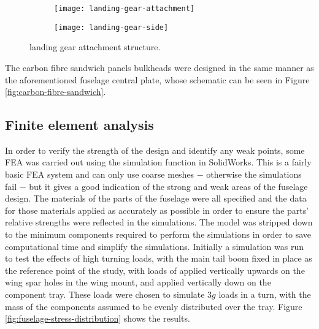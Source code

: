 \documentclass[../../main.tex]{subfiles}
\begin{document}

\begin{figure}[H]

    \centering
    \begin{subfigure}[b]{0.4\columnwidth}
        \centering
        \texttt{[image: landing-gear-attachment]}
        \caption{}
        \label{fig:landing-gear-attachment:angled}
    \end{subfigure}
    \hfill
    \begin{subfigure}[b]{0.49\columnwidth}
        \centering
        \texttt{[image: landing-gear-side]}
        \caption{}
        \label{fig:landing-gear-attachment:side}
    \end{subfigure}
    
    \caption{landing gear attachment structure.}
    \label{fig:landing-gear-attachment}
\end{figure}

The carbon fibre sandwich panels bulkheads were designed in the same manner as the aforementioned fuselage central plate, whose schematic can be seen in Figure \ref{fig:carbon-fibre-sandwich}. 


\subsection{Finite element analysis} \label{sec:final-design-proposal:fuselage:finite-element-analysis}

In order to verify the strength of the design and identify any weak points, some FEA was carried out using the simulation function in SolidWorks.
This is a fairly basic FEA system and can only use coarse meshes $-$ otherwise the simulations fail $-$ but it gives a good indication of the strong and weak areas of the fuselage design.
The materials of the parts of the fuselage were all specified and the data for those materials applied as accurately as possible in order to ensure the parts' relative strengths were reflected in the simulations.
The model was stripped down to the minimum components required to perform the simulations in order to save computational time and simplify the simulations.
Initially a simulation was run to test the effects of high turning loads, with the main tail boom fixed in place as the reference point of the study, with loads of  applied vertically upwards on the wing spar holes in the wing mount, and  applied vertically down on the component tray.
These loads were chosen to simulate $3g$ loads in a turn, with the mass of the components assumed to be evenly distributed over the tray.
Figure \ref{fig:fuselage-stress-distribution} shows the results.
\end{document}
